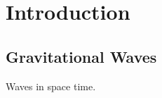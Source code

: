 \chapter{Introduction}
\label{chap:intro}
\newpage

\section{Gravitational Waves}
\label{sec:gws}

Waves in space time.

\lipsum[1-9] %
